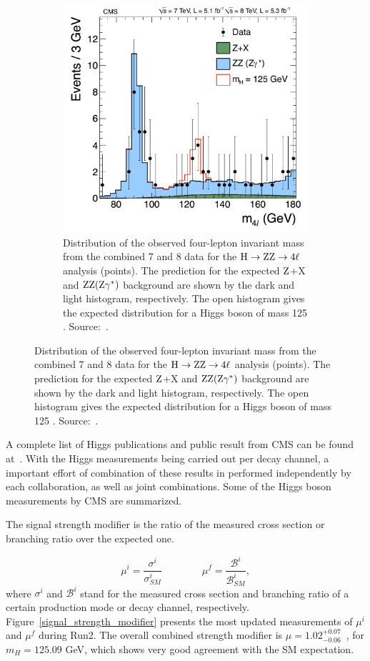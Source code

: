 \begin{figure}[htbp]
\begin{subfigure}[htbp]{0.48\textwidth}
    \includegraphics[width=\textwidth]{figures_and_tables/theory/higgs_discovery_hzz4l.pdf}
    \caption{ Distribution of the observed four-lepton invariant mass from the combined 7 and 8 \TeV data 
    for the $\mathrm{H} \to \mathrm{Z}\mathrm{Z}\to 4\ell$ analysis (points).
    The prediction for the expected $\mathrm{Z}$+X and $\mathrm{Z}\mathrm{Z}(\mathrm{Z}\gamma^*)$ background are shown by the dark and light histogram, respectively. The open histogram gives the expected distribution for a Higgs boson of mass 125 \GeV. Source:~\cite{higgs_discovery_cms}.}
    \label{higgs_discovery_hzz4l}
  \end{subfigure}
  \label{higgs_discovery}
\end{figure}

A complete list of Higgs publications and public result from CMS can be found at~\cite{cms_higgs_publications,cms_higgs_public_results}. With the Higgs measurements being carried out per decay channel, a important effort of combination of these results in performed independently by each collaboration, as well as joint combinations. Some of the Higgs boson measurements by CMS are summarized.

The signal strength modifier is the ratio of the measured cross section or branching ratio over the expected one. 

\begin{equation}
  \mu^{i} = \frac{\sigma^{i}}{\sigma^{i}_{SM}} \qquad\qquad   \mu^{f} = \frac{\mathcal{B}^{i}}{\mathcal{B}^{i}_{SM}}, 
  \label{signal_strength_modifier}
\end{equation}
where $\sigma^{i}$ and $\mathcal{B}^{i}$ stand for the measured cross section and branching ratio of a certain production mode or decay channel, respectively. Figure~\ref{signal_strength_modifier} presents the most updated measurements of $\mu^{i}$ and  $\mu^{f}$ during Run2. The overall combined strength modifier is $\mu=1.02^{+0.07}_{-0.06}$~\cite{cms_higgs_comb_run2}, for $m_{H} = 125.09$ GeV, which shows very good agreement with the SM expectation.

